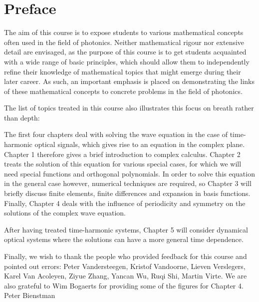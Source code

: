 \chapter{Preface}
\label{h:Preface}

The aim of this course is to expose students to various mathematical concepts often used in the field of photonics. Neither mathematical rigour nor extensive detail are envisaged, as the purpose of this course is to get students acquainted with a wide range of basic principles, which should allow them to independently refine their knowledge of mathematical topics that might emerge during their later career. As such, an important emphasis is placed on demonstrating the links of these mathematical concepts to concrete problems in the field of photonics.

The list of topics treated in this course also illustrates this focus on breath rather than depth:

The first four chapters deal with solving the wave equation in the case of time-harmonic optical signals, which gives rise to an equation in the complex plane. Chapter 1 therefore gives a brief introduction to complex calculus. Chapter 2 treats the solution of this equation for various special cases, for which we will need special functions and orthogonal polynomials. In order to solve this equation in the general case however, numerical techniques are required, so Chapter 3 will briefly discuss finite elements, finite differences and expansion in basis functions. Finally, Chapter 4 deals with the influence of periodicity and symmetry on the solutions of the complex wave equation.

After having treated time-harmonic systems, Chapter 5 will consider dynamical optical systems where the solutions can have a more general time dependence.

Finally, we wish to thank the people who provided feedback for this course and pointed out errors: Peter Vandersteegen, Kristof Vandoorne, Lieven Verslegers, Karel Van Acoleyen, Ziyue Zhang, Yancan Wu, Ruqi Shi, Martin Virte. We are also grateful to Wim Bogaerts for providing some of the figures for Chapter 4.\\[1cm]

\hspace{10cm} Peter Bienstman

